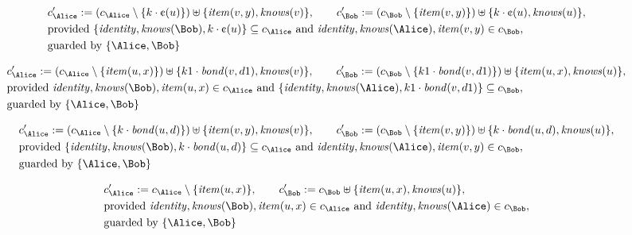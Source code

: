 \begin{align*}
&
c'_
{
\Alice
}
 := 
(c_
{
\Alice
}
 \setminus 
\{
k
\cdot
\text{\textcent}
(
u
)
\}
) \uplus 
\{
\mathit{
item
}
(
v
,
y
)
,
\mathit{
knows
}
(
v
)
\}
, \qquad 
c'_
{
\Bob
}
 := 
(c_
{
\Bob
}
 \setminus 
\{
\mathit{
item
}
(
v
,
y
)
\}
) \uplus 
\{
k
\cdot
\text{\textcent}
(
u
)
,
\mathit{
knows
}
(
u
)
\}
,\\
&
\text{provided } 
\{
\mathit{
identity
}
,
\mathit{
knows
}
(
\Bob
)
,
k
\cdot
\text{\textcent}
(
u
)
\}
 \subseteq c_
{
\Alice
}
 \text{ and } 
\mathit{
identity
}
,
\mathit{
knows
}
(
\Alice
)
,
\mathit{
item
}
(
v
,
y
)
 \in c_
{
\Bob
}
,\\
&
\text{guarded by } \{
\Alice
,
\Bob
\}
\end{align*}

\begin{align*}
&
c'_
{
\Alice
}
 := 
(c_
{
\Alice
}
 \setminus 
\{
\mathit{
item
}
(
u
,
x
)
\}
) \uplus 
\{
k1
\cdot
\mathit{
bond
}
(
v
,
d1
)
,
\mathit{
knows
}
(
v
)
\}
, \qquad 
c'_
{
\Bob
}
 := 
(c_
{
\Bob
}
 \setminus 
\{
k1
\cdot
\mathit{
bond
}
(
v
,
d1
)
\}
) \uplus 
\{
\mathit{
item
}
(
u
,
x
)
,
\mathit{
knows
}
(
u
)
\}
,\\
&
\text{provided } 
\mathit{
identity
}
,
\mathit{
knows
}
(
\Bob
)
,
\mathit{
item
}
(
u
,
x
)
 \in c_
{
\Alice
}
 \text{ and } 
\{
\mathit{
identity
}
,
\mathit{
knows
}
(
\Alice
)
,
k1
\cdot
\mathit{
bond
}
(
v
,
d1
)
\}
 \subseteq c_
{
\Bob
}
,\\
&
\text{guarded by } \{
\Alice
,
\Bob
\}
\end{align*}

\begin{align*}
&
c'_
{
\Alice
}
 := 
(c_
{
\Alice
}
 \setminus 
\{
k
\cdot
\mathit{
bond
}
(
u
,
d
)
\}
) \uplus 
\{
\mathit{
item
}
(
v
,
y
)
,
\mathit{
knows
}
(
v
)
\}
, \qquad 
c'_
{
\Bob
}
 := 
(c_
{
\Bob
}
 \setminus 
\{
\mathit{
item
}
(
v
,
y
)
\}
) \uplus 
\{
k
\cdot
\mathit{
bond
}
(
u
,
d
)
,
\mathit{
knows
}
(
u
)
\}
,\\
&
\text{provided } 
\{
\mathit{
identity
}
,
\mathit{
knows
}
(
\Bob
)
,
k
\cdot
\mathit{
bond
}
(
u
,
d
)
\}
 \subseteq c_
{
\Alice
}
 \text{ and } 
\mathit{
identity
}
,
\mathit{
knows
}
(
\Alice
)
,
\mathit{
item
}
(
v
,
y
)
 \in c_
{
\Bob
}
,\\
&
\text{guarded by } \{
\Alice
,
\Bob
\}
\end{align*}

\begin{align*}
&
c'_
{
\Alice
}
 := 
c_
{
\Alice
}
 \setminus 
\{
\mathit{
item
}
(
u
,
x
)
\}
, \qquad 
c'_
{
\Bob
}
 := 
c_
{
\Bob
}
 \uplus 
\{
\mathit{
item
}
(
u
,
x
)
,
\mathit{
knows
}
(
u
)
\}
,\\
&
\text{provided } 
\mathit{
identity
}
,
\mathit{
knows
}
(
\Bob
)
,
\mathit{
item
}
(
u
,
x
)
 \in c_
{
\Alice
}
 \text{ and } 
\mathit{
identity
}
,
\mathit{
knows
}
(
\Alice
)
 \in c_
{
\Bob
}
,\\
&
\text{guarded by } \{
\Alice
,
\Bob
\}
\end{align*}

